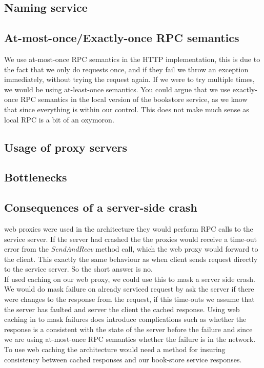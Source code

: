 \documentclass[a4paper]{article}
\begin{document}
\subsection{Naming service}

\subsection{At-most-once/Exactly-once RPC semantics}
We use at-most-once RPC semantics in the HTTP implementation, this is due to the fact that we only do requests once, and if they fail we throw an exception immediately, without trying the request again. If we were to try multiple times, we would be using at-least-once semantics. You could argue that we use exactly-once RPC semantics in the local version of the bookstore service, as we know that since everything is within our control. This does not make much sense as local RPC is a bit of an oxymoron.
\subsection{Usage of proxy servers}

\subsection{Bottlenecks}

\subsection{Consequences of a server-side crash}
web proxies were used in the architecture they would perform RPC calls to the service server. If the server had crashed the the proxies would receive a time-out error from the \textit{SendAndRecv} method call, which the web proxy would forward to the client. This exactly the same behaviour as when client sends request directly to the service server. So the short answer is no.\\
If used caching on our web proxy, we could use this to mask a server side crash. We would do mask failure on already serviced request by ask the server if there were changes to the response from the request, if this time-outs we assume that the server has faulted and server the client the cached response. Using web caching in to mask failures does introduce complications such as whether the response is a consistent with the state of the server before the failure and since we are using at-most-once RPC semantics whether the failure is in the network.\\
To use web caching the architecture would need a method for insuring consistency between cached responses and our book-store service responses. 
\end{document}
